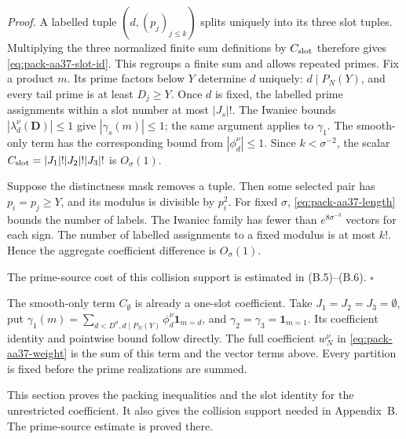 \emph{Proof.} A labelled tuple $(d,(p_j)_{j\le k})$ splits uniquely
into its three slot tuples. Multiplying the three normalized finite
sum definitions by $C_{\rm slot}$ therefore gives
\eqref{eq:pack-aa37-slot-id}. This regroups a finite sum and
allows repeated primes. Fix a product $m$. Its prime factors
below $Y$ determine $d$ uniquely: $d\mid P_N(Y)$, and every tail
prime is at least $D_j\ge Y$. Once $d$ is fixed, the labelled prime
assignments within a slot number at most $|J_s|!$. The Iwaniec bounds
$|\lambda_d^\nu(\mathbf D)|\le1$ give $|\gamma_s(m)|\le1$;
the same argument applies to $\gamma_1$. The smooth-only term has
the corresponding bound from $|\phi_d^\nu|\le1$. Since
$k<\sigma^{-2}$, the scalar
$C_{\rm slot}=|J_1|!|J_2|!|J_3|!$ is $O_\sigma(1)$.

Suppose the distinctness mask removes a tuple. Then some selected pair
has $p_i=p_j\ge Y$, and its modulus is divisible by $p_i^2$. For fixed
$\sigma$, \eqref{eq:pack-aa37-length} bounds the number of labels.
The Iwaniec family has fewer than $e^{8\sigma^{-3}}$ vectors for each
sign. The number of labelled
assignments to a fixed modulus is at most $k!$. Hence the aggregate
coefficient difference is $O_\sigma(1)$.

The prime-source cost of this collision support is estimated in
(B.5)--(B.6). \hfill$\square$

The smooth-only term $C_{\emptyset}$ is already a one-slot coefficient.
Take $J_1=J_2=J_3=\emptyset$, put
$\gamma_1(m)=\sum_{d<D^\sigma,d\mid P_N(Y)}
\phi_d^\nu\mathbf1_{m=d}$, and
$\gamma_2=\gamma_3=\mathbf1_{m=1}$. Its coefficient identity and
pointwise bound follow directly. The full coefficient $w_N^\nu$ in
\eqref{eq:pack-aa37-weight} is the sum of this term and the vector
terms above. Every partition is fixed
before the prime realizations are summed.

This section proves the packing inequalities and the slot identity for
the unrestricted coefficient. It also gives the collision support
needed in Appendix~B.
The prime-source estimate is proved there.
